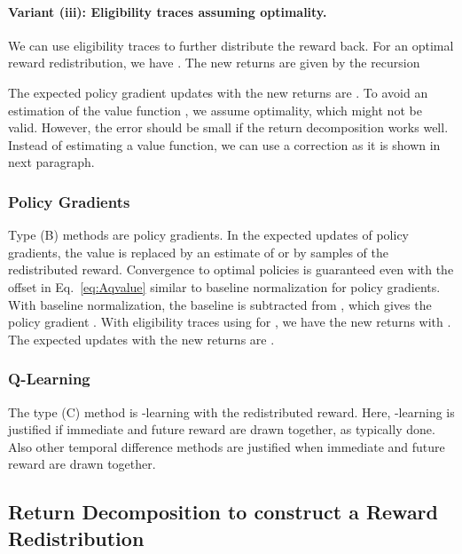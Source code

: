 \documentclass{article}
\begin{document}
\begin{appendices}
\paragraph{Variant (iii): Eligibility traces assuming optimality.}
We can use eligibility traces to further distribute the reward back.
For an optimal reward redistribution, we have
. 
The new returns  are given by the recursion

The expected policy gradient updates with the new returns  are
.
To avoid an estimation of the value function , 
we assume optimality,
which might not be valid. However, the error should be small if the 
return decomposition works well.
Instead of estimating a value function, we can use a correction 
as it is shown in
next paragraph.



\subsubsection{Policy Gradients}
\label{sec:PolicyA}
Type (B) methods are policy gradients.
 In the expected updates  
 of policy gradients, the value  
is replaced by an estimate of  or by
samples of the redistributed reward. 
Convergence to optimal policies is guaranteed even with the
offset  in Eq.~\eqref{eq:Aqvalue} 
similar to baseline normalization for policy gradients.
With baseline normalization,
the baseline  
is subtracted from , which gives the policy gradient  
. 
With eligibility traces using  for  \cite{Sutton:18book}, we have 
the new returns  with .
The expected updates with the new returns  are
.


\subsubsection{Q-Learning}
\label{sec:qlearningA}
The type (C) method is -learning with the redistributed reward. 
Here, -learning is justified if
immediate and future reward are drawn together,
as typically done.
Also other temporal difference methods are justified when
immediate and future reward are drawn together.

\subsection{Return Decomposition to construct a Reward Redistribution}



\end{appendices}
\end{document}
